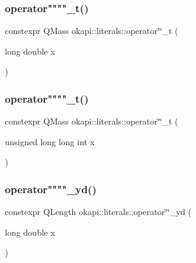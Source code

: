 \mbox{\label{namespaceokapi_1_1literals_ac7aced95338b2abd4d667c96cb272b5a}} 
\subsubsection{\texorpdfstring{operator""""\_t()}{operator""\_t()}\hspace{0.1cm}{\footnotesize\ttfamily [1/2]}}
{\footnotesize\ttfamily constexpr Q\+Mass okapi\+::literals\+::operator\char`\"{}\char`\"{}\+\_\+t (\begin{DoxyParamCaption}\item[{long double}]{x }\end{DoxyParamCaption})}

\mbox{\label{namespaceokapi_1_1literals_a5c8a173b5ef5dad16c7ce8aed95cc373}} 
\subsubsection{\texorpdfstring{operator""""\_t()}{operator""\_t()}\hspace{0.1cm}{\footnotesize\ttfamily [2/2]}}
{\footnotesize\ttfamily constexpr Q\+Mass okapi\+::literals\+::operator\char`\"{}\char`\"{}\+\_\+t (\begin{DoxyParamCaption}\item[{unsigned long long int}]{x }\end{DoxyParamCaption})}

\mbox{\label{namespaceokapi_1_1literals_abd0e2b409e8196d383eef69044bb9d67}} 
\subsubsection{\texorpdfstring{operator""""\_yd()}{operator""\_yd()}\hspace{0.1cm}{\footnotesize\ttfamily [1/2]}}
{\footnotesize\ttfamily constexpr Q\+Length okapi\+::literals\+::operator\char`\"{}\char`\"{}\+\_\+yd (\begin{DoxyParamCaption}\item[{long double}]{x }\end{DoxyParamCaption})}

